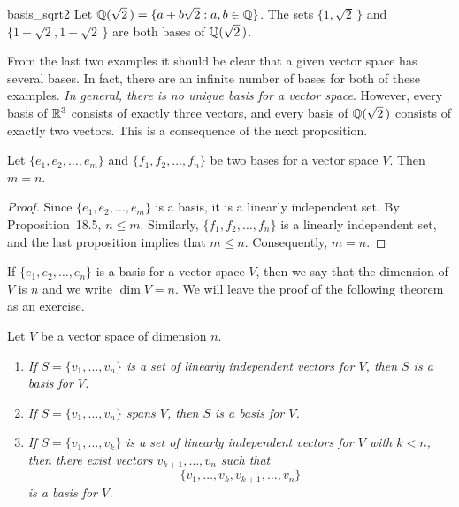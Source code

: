 \begin{example}{basis_sqrt2}
Let $\mbox{${\Bbb Q}( \sqrt{2}\, )$} = \{ a + b \sqrt{2} : a, b \in {\Bbb Q} \}$.
The sets $\{1, \sqrt{2}\,  \}$ and $\{1+\sqrt{2}, 1- \sqrt{2}\,  \}$ are
both bases of ${\Bbb Q}( \sqrt{2}\, )$.  
\end{example}





From the last two examples it should be clear that a given vector
space has several bases. In fact, there are an infinite number of
bases for both of these examples. {\em In general, there is no unique 
basis for a vector space}.  However, every basis of ${\Bbb R}^3$ consists
of exactly three vectors, and every  basis of ${\Bbb Q}(\sqrt{2}\, )$ 
consists of exactly two vectors. This is a consequence of the next 
proposition.


\begin{proposition}
Let $\{ e_1, e_2, \ldots, e_m \}$ and $\{ f_1, f_2, \ldots, f_n \}$ be
two bases for a vector space $V$. Then $m=n$. 
\end{proposition}


\begin{proof}
Since $\{ e_1, e_2, \ldots, e_m \}$ is a basis, it is a linearly
independent set.  By  Proposition~18.5, $n \leq m$. Similarly, $\{
f_1, f_2, \ldots, f_n \}$ is a linearly independent set, and the last
proposition implies that $m \leq n$.  Consequently, $m =n$.
\mbox{\hspace{1in}}
\end{proof}
 

\medskip
 

If $\{ e_1, e_2, \ldots, e_n \}$ is a basis for a vector space $V$,
then we say that the {\bfi dimension\/}
of $V$ is $n$ and we write $\dim V =n$\label{vectdim}. 
We will leave the proof of the following theorem as an exercise.


\begin{theorem}
Let $V$ be a vector space of dimension $n$.
\begin{enumerate}

\rm \item \it
If $S = \{v_1, \ldots, v_n \}$ is a set of linearly independent
vectors for $V$, then $S$ is a basis for $V$. 

\rm \item \it
If $S = \{v_1, \ldots, v_n \}$ spans $V$, then $S$ is a basis for $V$. 

\rm \item \it
If $S = \{v_1, \ldots, v_k \}$ is a set of linearly independent
vectors for $V$ with $k < n$, then there exist vectors $v_{k+1},
\ldots, v_n$ such that  
\[
\{v_1, \ldots, v_k, v_{k+1}, \ldots, v_n \}
\] 
is a basis for $V$. 

\end{enumerate}
\end{theorem}


